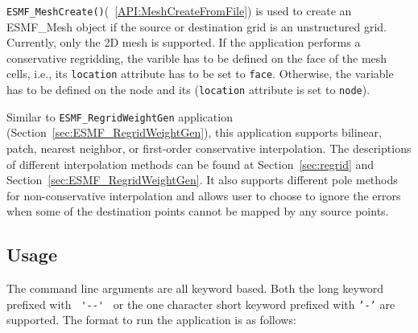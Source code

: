 {\tt ESMF\_MeshCreate()}(~\ref{API:MeshCreateFromFile}) is used to create an ESMF\_Mesh object if the
source or destination grid is an unstructured grid. Currently, only the 2D mesh is supported.
If the application performs a conservative regridding, the varible has to be defined on the face of the mesh cells, i.e., its {\tt location} attribute has to be set to {\tt face}.  Otherwise, the variable has to be 
defined on the node and its ({\tt location} attribute is set to {\tt node}).

Similar to {\tt ESMF\_RegridWeightGen} application (Section~\ref{sec:ESMF_RegridWeightGen}), this application supports
bilinear, patch, nearest neighbor, or first-order conservative interpolation. The descriptions of different 
interpolation methods can be found at Section~\ref{sec:regrid} and Section~\ref{sec:ESMF_RegridWeightGen}. 
It also supports different pole methods for non-conservative interpolation and allows user to choose to 
ignore the errors when some of the destination points cannot be mapped by any source points. 

\subsection{Usage}\label{sec:fileregridusage}

The command line arguments are all keyword based.  Both the long keyword prefixed with \verb+ '--' + or the
one character short keyword prefixed with {\tt '-'} are supported.  The format to run the application is
as follows:

